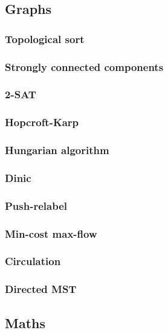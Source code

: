 \documentclass[a4paper, twocolumn, 10pt]{report}
\begin{document}
\footnotesize
\subsection*{Graphs}
\subsubsection*{Topological sort}

\subsubsection*{Strongly connected components}

\subsubsection*{2-SAT}

\subsubsection*{Hopcroft-Karp}

\subsubsection*{Hungarian algorithm}

\subsubsection*{Dinic}

\subsubsection*{Push-relabel}

\subsubsection*{Min-cost max-flow}

\subsubsection*{Circulation}

\subsubsection*{Directed MST}


\newpage
\subsection*{Maths}
\end{document}
